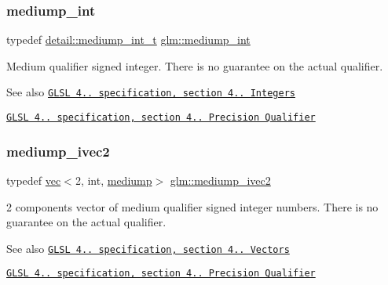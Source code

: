 \subsubsection{\texorpdfstring{mediump\+\_\+int}{mediump\_int}}
{\footnotesize\ttfamily typedef \mbox{\hyperlink{namespaceglm_1_1detail_aede0757f19204d1d44f716b3dd66d13c}{detail\+::mediump\+\_\+int\+\_\+t}} \mbox{\hyperlink{group__core__precision_ga2a3dcbcd7f4e17663d393a12061ac6ac}{glm\+::mediump\+\_\+int}}}

Medium qualifier signed integer. There is no guarantee on the actual qualifier.

\begin{DoxySeeAlso}{See also}
\href{http://www.opengl.org/registry/doc/GLSLangSpec.4.20.8.pdf}{\tt G\+L\+SL 4.. specification, section 4.. Integers} 

\href{http://www.opengl.org/registry/doc/GLSLangSpec.4.20.8.pdf}{\tt G\+L\+SL 4.. specification, section 4.. Precision Qualifier} 
\end{DoxySeeAlso}
\mbox{\label{group__core__precision_ga0efcfa6750f1c7197ff1c3390521ffd7}} 
\subsubsection{\texorpdfstring{mediump\+\_\+ivec2}{mediump\_ivec2}}
{\footnotesize\ttfamily typedef \mbox{\hyperlink{structglm_1_1vec}{vec}}$<$2, int, \mbox{\hyperlink{namespaceglm_a36ed105b07c7746804d7fdc7cc90ff25a6416f3ea0c9025fb21ed50c4d6620482}{mediump}}$>$ \mbox{\hyperlink{group__core__precision_ga0efcfa6750f1c7197ff1c3390521ffd7}{glm\+::mediump\+\_\+ivec2}}}

2 components vector of medium qualifier signed integer numbers. There is no guarantee on the actual qualifier.

\begin{DoxySeeAlso}{See also}
\href{http://www.opengl.org/registry/doc/GLSLangSpec.4.20.8.pdf}{\tt G\+L\+SL 4.. specification, section 4.. Vectors} 

\href{http://www.opengl.org/registry/doc/GLSLangSpec.4.20.8.pdf}{\tt G\+L\+SL 4.. specification, section 4.. Precision Qualifier} 
\end{DoxySeeAlso}
\mbox{\label{group__core__precision_ga33f150e1d55aa6c91927cb0431bf0708}} 
